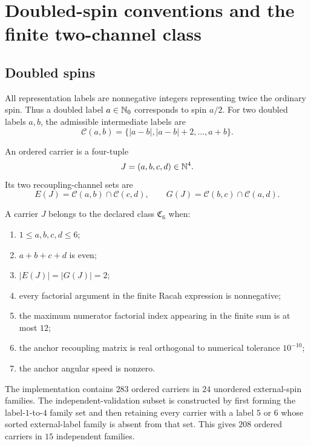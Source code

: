 \section{Doubled-spin conventions and the finite two-channel class}
\subsection{Doubled spins}
All representation labels are nonnegative integers representing twice the ordinary spin.  Thus a doubled label $a\in\mathbb N_0$ corresponds to spin $a/2$.  For two doubled labels $a,b$, the admissible intermediate labels are
\begin{equation}
\mathcal C(a,b)=\{|a-b|,|a-b|+2,\ldots,a+b\}.
\label{eq:pairchannels}
\end{equation}

\begin{definition}
An ordered carrier is a four-tuple
\[
J=(a,b,c,d)\in\mathbb N^4.
\]
Its two recoupling-channel sets are
\begin{equation}
E(J)=\mathcal C(a,b)\cap\mathcal C(c,d),
\qquad
G(J)=\mathcal C(b,c)\cap\mathcal C(a,d).
\label{eq:channelsets}
\end{equation}
\end{definition}

\begin{definition}
A carrier $J$ belongs to the declared class $\mathfrak C_6$ when:
\begin{enumerate}[label=(\alph*)]
\item $1\le a,b,c,d\le6$;
\item $a+b+c+d$ is even;
\item $|E(J)|=|G(J)|=2$;
\item every factorial argument in the finite Racah expression is nonnegative;
\item the maximum numerator factorial index appearing in the finite sum is at most $12$;
\item the anchor recoupling matrix is real orthogonal to numerical tolerance $10^{-10}$;
\item the anchor angular speed is nonzero.
\end{enumerate}
\end{definition}

The implementation contains $283$ ordered carriers in $24$ unordered external-spin families.  The independent-validation subset is constructed by first forming the label-$1$-to-$4$ family set and then retaining every carrier with a label $5$ or $6$ whose sorted external-label family is absent from that set.  This gives $208$ ordered carriers in $15$ independent families.

